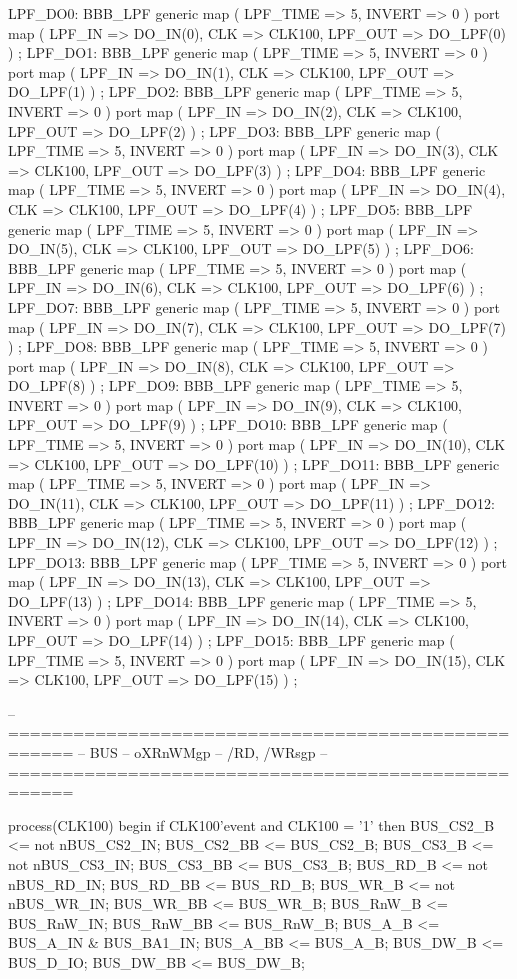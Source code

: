 \begin{mylisting}[language=VHDL,caption=トップモジュール,label=appF_Top_module_VHDL]
{{{	LPF_DO0: BBB_LPF	generic map ( LPF_TIME => 5,	INVERT => 0 )	port map ( LPF_IN => DO_IN(0),		CLK => CLK100,		LPF_OUT => DO_LPF(0) ) ;
	LPF_DO1: BBB_LPF	generic map ( LPF_TIME => 5,	INVERT => 0 )	port map ( LPF_IN => DO_IN(1),		CLK => CLK100,		LPF_OUT => DO_LPF(1) ) ;
	LPF_DO2: BBB_LPF	generic map ( LPF_TIME => 5,	INVERT => 0 )	port map ( LPF_IN => DO_IN(2),		CLK => CLK100,		LPF_OUT => DO_LPF(2) ) ;
	LPF_DO3: BBB_LPF	generic map ( LPF_TIME => 5,	INVERT => 0 )	port map ( LPF_IN => DO_IN(3),		CLK => CLK100,		LPF_OUT => DO_LPF(3) ) ;
	LPF_DO4: BBB_LPF	generic map ( LPF_TIME => 5,	INVERT => 0 )	port map ( LPF_IN => DO_IN(4),		CLK => CLK100,		LPF_OUT => DO_LPF(4) ) ;
	LPF_DO5: BBB_LPF	generic map ( LPF_TIME => 5,	INVERT => 0 )	port map ( LPF_IN => DO_IN(5),		CLK => CLK100,		LPF_OUT => DO_LPF(5) ) ;
	LPF_DO6: BBB_LPF	generic map ( LPF_TIME => 5,	INVERT => 0 )	port map ( LPF_IN => DO_IN(6),		CLK => CLK100,		LPF_OUT => DO_LPF(6) ) ;
	LPF_DO7: BBB_LPF	generic map ( LPF_TIME => 5,	INVERT => 0 )	port map ( LPF_IN => DO_IN(7),		CLK => CLK100,		LPF_OUT => DO_LPF(7) ) ;
	LPF_DO8: BBB_LPF	generic map ( LPF_TIME => 5,	INVERT => 0 )	port map ( LPF_IN => DO_IN(8),		CLK => CLK100,		LPF_OUT => DO_LPF(8) ) ;
	LPF_DO9: BBB_LPF	generic map ( LPF_TIME => 5,	INVERT => 0 )	port map ( LPF_IN => DO_IN(9),		CLK => CLK100,		LPF_OUT => DO_LPF(9) ) ;
	LPF_DO10: BBB_LPF	generic map ( LPF_TIME => 5,	INVERT => 0 )	port map ( LPF_IN => DO_IN(10),		CLK => CLK100,		LPF_OUT => DO_LPF(10) ) ;
	LPF_DO11: BBB_LPF	generic map ( LPF_TIME => 5,	INVERT => 0 )	port map ( LPF_IN => DO_IN(11),		CLK => CLK100,		LPF_OUT => DO_LPF(11) ) ;
	LPF_DO12: BBB_LPF	generic map ( LPF_TIME => 5,	INVERT => 0 )	port map ( LPF_IN => DO_IN(12),		CLK => CLK100,		LPF_OUT => DO_LPF(12) ) ;
	LPF_DO13: BBB_LPF	generic map ( LPF_TIME => 5,	INVERT => 0 )	port map ( LPF_IN => DO_IN(13),		CLK => CLK100,		LPF_OUT => DO_LPF(13) ) ;
	LPF_DO14: BBB_LPF	generic map ( LPF_TIME => 5,	INVERT => 0 )	port map ( LPF_IN => DO_IN(14),		CLK => CLK100,		LPF_OUT => DO_LPF(14) ) ;
	LPF_DO15: BBB_LPF	generic map ( LPF_TIME => 5,	INVERT => 0 )	port map ( LPF_IN => DO_IN(15),		CLK => CLK100,		LPF_OUT => DO_LPF(15) ) ;



-- ====================================================
-- BUS
--   oXRnWMgp
--   /RD, /WRsgp
-- ====================================================

	process(CLK100)
	begin
		if CLK100'event and CLK100 = '1' then
			BUS_CS2_B		<=	not nBUS_CS2_IN;
			BUS_CS2_BB		<=	BUS_CS2_B;
			BUS_CS3_B		<=	not nBUS_CS3_IN;
			BUS_CS3_BB		<=	BUS_CS3_B;
			BUS_RD_B		<=	not nBUS_RD_IN;
			BUS_RD_BB		<=	BUS_RD_B;
			BUS_WR_B		<=	not nBUS_WR_IN;
			BUS_WR_BB		<=	BUS_WR_B;
			BUS_RnW_B		<=	BUS_RnW_IN;
			BUS_RnW_BB		<=	BUS_RnW_B;
			BUS_A_B			<=	BUS_A_IN & BUS_BA1_IN;
			BUS_A_BB		<=	BUS_A_B;
			BUS_DW_B		<=	BUS_D_IO;
			BUS_DW_BB		<=	BUS_DW_B;

}}}
\end{mylisting}
